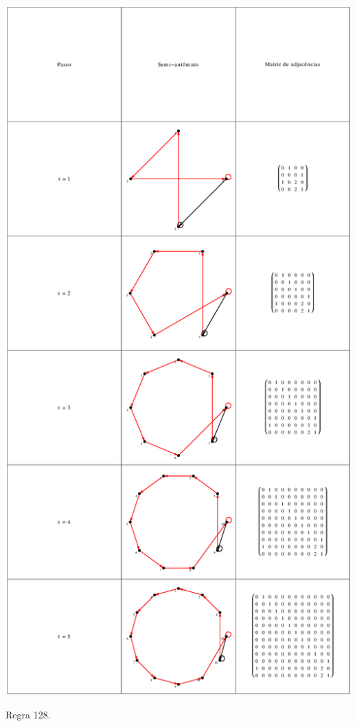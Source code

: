 \documentclass[12pt,a4paper]{article}
\begin{document}
\begin{table}[H]
\begin{center}
\includegraphics[scale=0.32]{img/mat/matr128.eps}
\caption{Regra 128.}
\label{tab:mr128}
\end{center}
\end{table}
\end{document}
